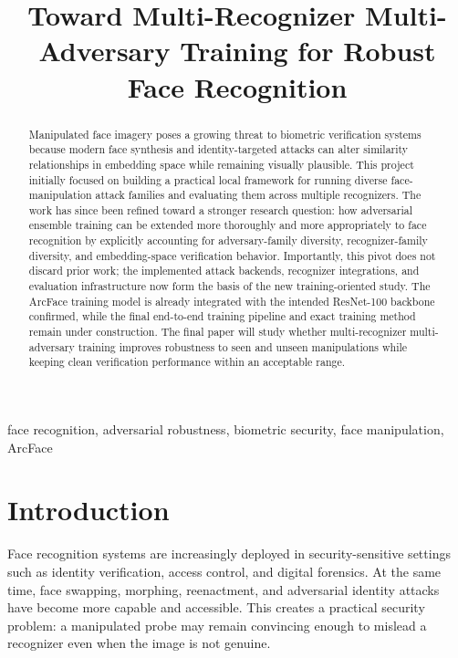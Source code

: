 \documentclass[conference]{IEEEtran}
\begin{document}
\title{Toward Multi-Recognizer Multi-Adversary Training for Robust Face Recognition}

\author{
}

\maketitle

\begin{abstract}
Manipulated face imagery poses a growing threat to biometric verification
systems because modern face synthesis and identity-targeted attacks can alter
similarity relationships in embedding space while remaining visually plausible.
This project initially focused on building a practical local framework for
running diverse face-manipulation attack families and evaluating them across
multiple recognizers. The work has since been refined toward a stronger
research question: how adversarial ensemble training can be extended more
thoroughly and more appropriately to face recognition by explicitly accounting
for adversary-family diversity, recognizer-family diversity, and
embedding-space verification behavior. Importantly, this pivot does not
discard prior work; the implemented attack backends, recognizer integrations,
and evaluation infrastructure now form the basis of the new training-oriented
study. The ArcFace training model is already integrated with the intended
ResNet-100 backbone confirmed, while the final end-to-end training pipeline
and exact training method remain under construction. The final paper will
study whether multi-recognizer multi-adversary training improves robustness to
seen and unseen manipulations while keeping clean verification performance
within an acceptable range.
\end{abstract}

\begin{IEEEkeywords}
face recognition, adversarial robustness, biometric security, face manipulation, ArcFace
\end{IEEEkeywords}

\section{Introduction}
Face recognition systems are increasingly deployed in security-sensitive
settings such as identity verification, access control, and digital forensics.
At the same time, face swapping, morphing, reenactment, and adversarial
identity attacks have become more capable and accessible. This creates a
practical security problem: a manipulated probe may remain convincing enough to
mislead a recognizer even when the image is not genuine.
\end{document}
